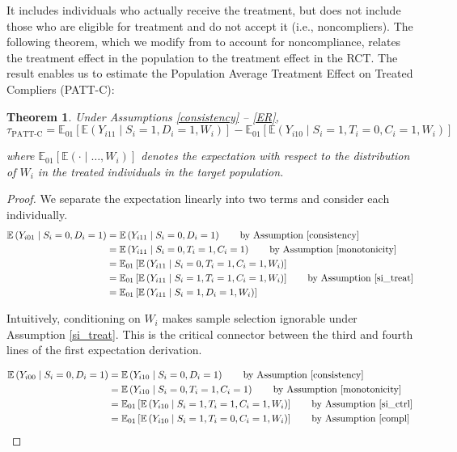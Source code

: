 \documentclass[hidelinks,12pt]{article}
\newtheorem{theorem}{Theorem}
\newcommand{\ex}{\mathbb{E}} %
\begin{document}
{It includes individuals who actually receive the treatment, but does not include those who are eligible for treatment and do not accept it (i.e., noncompliers). The following theorem, which we modify from \citet{Hartman} to account for noncompliance, relates the treatment effect in the population to the treatment effect in the RCT. {\color{red}The result enables us to estimate the Population Average Treatment Effect on Treated Compliers (PATT-C):}

\vskip 0.2in
\begin{theorem}\label{thm1}
Under Assumptions \ref{consistency} -- \ref{ER},
\begin{equation}\label{tpatt-est}
\tau_{\text{PATT-C}} = \ex_{01}\left[  \ex\left(Y_{i11} \mid S_i=1, D_i=1, W_i\right)\right]
-\ex_{01}\left[  \ex\left(Y_{i10} \mid S_i=1, T_i=0, C_i=1, W_i\right) \right] 
\end{equation}

where $\ex_{01}\left[\ex(\cdot \mid\dots, W_i)\right]$ denotes the expectation with respect to the distribution of $W_i$ in the treated individuals in the target population. 
\end{theorem}

\begin{proof}
We separate the expectation linearly into two terms and consider each individually.
\begin{align*}
\ex\left(Y_{i01} \mid S_i=0,D_i=1\right) &= \ex\left(Y_{i11} \mid S_i=0, D_i=1\right) \tag*{by Assumption \ref{consistency}} \\
&= \ex\left(Y_{i11} \mid S_i=0, T_i=1, C_i=1\right) \tag*{by Assumption \ref{monotonicity}} \\
&= \ex_{01}\left[  \ex\left(Y_{i11} \mid S_i=0, T_i=1, C_i=1, W_i\right) \right] \\
&= \ex_{01}\left[  \ex\left(Y_{i11} \mid S_i=1, T_i=1, C_i=1, W_i\right) \right] \tag*{by Assumption \ref{si_treat}} \\
&= \ex_{01}\left[  \ex\left(Y_{i11} \mid S_i=1, D_i=1, W_i\right)\right] 
\end{align*}

{\color{red}Intuitively, conditioning on $W_i$ makes sample selection ignorable under Assumption \ref{si_treat}. This is the critical connector between the third and fourth lines of the first expectation derivation.}
	
\begin{align*}
\ex\left(Y_{i00} \mid S_i=0, D_i=1\right) &= \ex\left(Y_{i10} \mid S_i=0, D_i=1\right) \tag*{by Assumption \ref{consistency}} \\
&= \ex\left(Y_{i10} \mid S_i=0, T_i=1, C_i=1\right) \tag*{by Assumption \ref{monotonicity}} \\
&= \ex_{01}\left[  \ex\left(Y_{i10} \mid S_i=1, T_i=1, C_i=1, W_i\right) \right] \tag*{by Assumption \ref{si_ctrl}} \\
&= \ex_{01}\left[  \ex\left(Y_{i10} \mid S_i=1, T_i=0, C_i=1, W_i\right) \right] \tag*{by Assumption \ref{compl}}\\
\end{align*}


\end{proof}}
\end{document}
